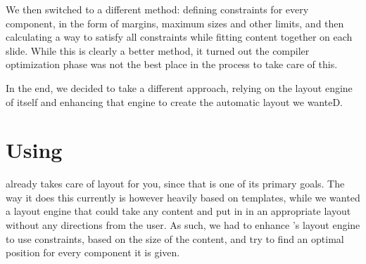    We then switched to a different method: defining constraints for every
   component, in the form of margins, maximum sizes and other limits, and then
   calculating a way to satisfy all constraints while fitting content together
   on each slide. While this is clearly a better method, it turned out the
   compiler optimization phase was not the best place in the process to take
   care of this.

   In the end, we decided to take a different approach, relying on the layout
   engine of \mxp itself and enhancing that engine to create the automatic
   layout we wanteD.

  \section{Using \mxp}

   \mxp already takes care of layout for you, since that is one of its primary
   goals. The way it does this currently is however heavily based on templates,
   while we wanted a layout engine that could take any content and put in in an
   appropriate layout without any directions from the user. As such, we had to
   enhance \mxp's layout engine to use constraints, based on the size of the
   content, and try to find an optimal position for every component it is
   given.

